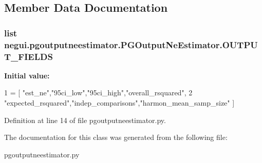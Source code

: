 \subsection{Member Data Documentation}
\subsubsection[{\texorpdfstring{O\+U\+T\+P\+U\+T\+\_\+\+F\+I\+E\+L\+DS}{OUTPUT_FIELDS}}]{\setlength{\rightskip}{0pt plus 5cm}list negui.\+pgoutputneestimator.\+P\+G\+Output\+Ne\+Estimator.\+O\+U\+T\+P\+U\+T\+\_\+\+F\+I\+E\+L\+DS\hspace{0.3cm}{\ttfamily [static]}}\hypertarget{classnegui_1_1pgoutputneestimator_1_1PGOutputNeEstimator_aa78fb93f7acf4a769ae309f1a3b94302}{}\label{classnegui_1_1pgoutputneestimator_1_1PGOutputNeEstimator_aa78fb93f7acf4a769ae309f1a3b94302}
{\bfseries Initial value\+:}
\begin{DoxyCode}
1 = [ \textcolor{stringliteral}{"est\_ne"},\textcolor{stringliteral}{"95ci\_low"},\textcolor{stringliteral}{"95ci\_high"},\textcolor{stringliteral}{"overall\_rsquared"},
2                     \textcolor{stringliteral}{"expected\_rsquared"},\textcolor{stringliteral}{"indep\_comparisons"},\textcolor{stringliteral}{"harmon\_mean\_samp\_size"} ]
\end{DoxyCode}


Definition at line 14 of file pgoutputneestimator.\+py.



The documentation for this class was generated from the following file\+:\begin{DoxyCompactItemize}
\item 
pgoutputneestimator.\+py\end{DoxyCompactItemize}
